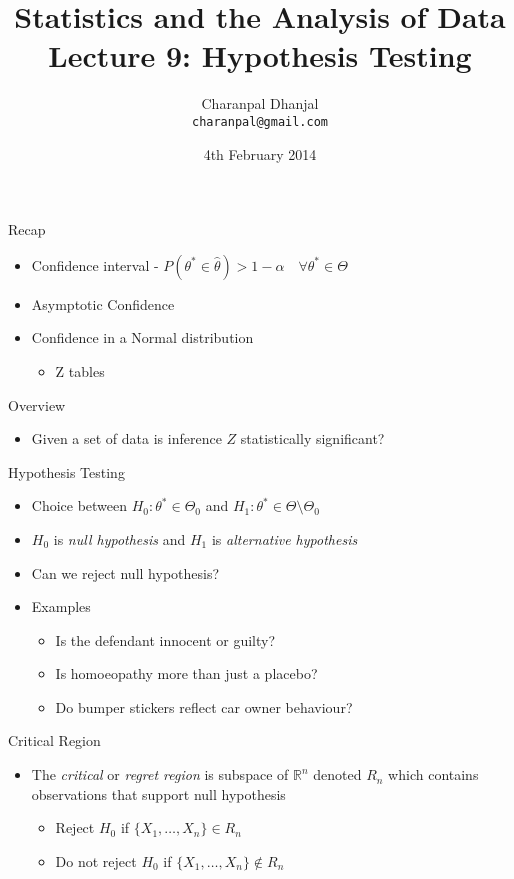 \documentclass{beamer}
\title{Statistics and the Analysis of Data\\ Lecture 9: Hypothesis Testing}
\author{Charanpal Dhanjal \\ \texttt{charanpal@gmail.com}}
\institute{\'{E}cole des Ponts}
\date{4th February 2014}
\begin{document}
\frame{\titlepage}

\begin{frame}{Recap}  
\begin{itemize} 
 \item Confidence interval -  $P(\theta^* \in \hat{\theta}) > 1 - \alpha \quad \forall \theta^* \in \Theta $
 \item Asymptotic Confidence
 \item Confidence in a Normal distribution
\begin{itemize} 
\item Z tables 
\end{itemize}
\end{itemize} 
\end{frame}

\begin{frame}{Overview}
\begin{itemize} 
 \item Given a set of data is inference $Z$ statistically significant?
\end{itemize}
\end{frame}

\begin{frame}{Hypothesis Testing}  
\begin{itemize} 
\item Choice between $H_0: \theta^* \in \Theta_0$ and $H_1: \theta^* \in \Theta \setminus \Theta_0$
\item $H_0$ is \emph{null hypothesis} and $H_1$ is \emph{alternative hypothesis} 
\item Can we reject null hypothesis? 
\item Examples 
\begin{itemize} 
\item Is the defendant innocent or guilty? 
\item Is homoeopathy more than just a placebo? 
\item Do bumper stickers reflect car owner behaviour? 
\end{itemize}
\end{itemize}
\end{frame}

\begin{frame}{Critical Region} 
\begin{itemize} 
 \item The \emph{critical} or \emph{regret region} is subspace of $\mathbb{R}^n$ denoted $R_n$ which contains observations that support null hypothesis 
 \begin{itemize}
 \item Reject $H_0$ if $\{X_1, \ldots, X_n\} \in R_n$ 
 \item Do not reject $H_0$ if $\{X_1, \ldots, X_n\} \notin R_n$ 
 \end{itemize} 
\end{itemize}
\end{frame}
\end{document}
